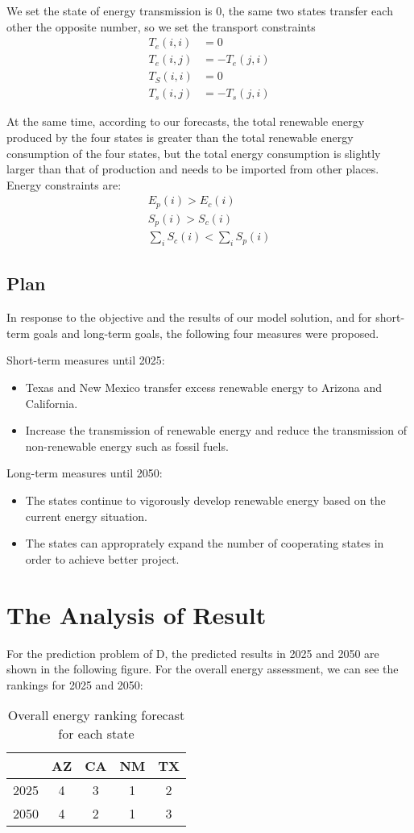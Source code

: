 \documentclass{mcmthesis}
\begin{document}
We set the state of energy transmission is 0, the same two states transfer each other the opposite number, so we set the transport constraints
\begin{align}
  T_e(i,i) &= 0 \\
  T_e(i,j) &= -T_e(j,i) \\
  T_S(i,i) &= 0 \\
  T_s(i,j) &= -T_s(j,i)
\end{align}

At the same time, according to our forecasts, the total renewable energy produced by the four states is greater than the total renewable energy consumption of the four states, but the total energy consumption is slightly larger than that of production and needs to be imported from other places. Energy constraints are:
\begin{align}
  E_p(i) > E_c(i) \\
  S_p(i) > S_c(i) \\
  \sum\limits_{i}S_c(i) < \sum\limits_{i}S_p(i) 
\end{align}
\subsection{Plan}

In response to the objective and the results of our model solution, and for short-term goals and long-term goals, the following four measures were proposed.

Short-term measures until 2025:
\begin{itemize}
  \item Texas and New Mexico transfer excess renewable energy to Arizona and California.
  \item Increase the transmission of renewable energy and reduce the transmission of non-renewable energy such as fossil fuels.
\end{itemize}
Long-term measures until 2050:
\begin{itemize}
  \item The states continue to vigorously develop renewable energy based on the current energy situation.
  \item The states can approprately expand the number of cooperating states in order to achieve better project. 
\end{itemize}

\section{The Analysis of Result}
For the prediction problem of D, the predicted results in 2025 and 2050 are shown in the following figure. For the overall energy assessment, we can see the rankings for 2025 and 2050:
\begin{table}[H]
\centering
\caption{Overall energy ranking forecast for each state}
\label{oerf}
\begin{tabular}{|c|c|c|c|c|}
\hline
   &   AZ & CA & NM & TX   \\ \hline
2025 & 4  & 3  & 1  & 2 \\ \hline
2050 & 4  & 2  & 1  & 3 \\ \hline
\end{tabular}
\end{table}
\end{document}
